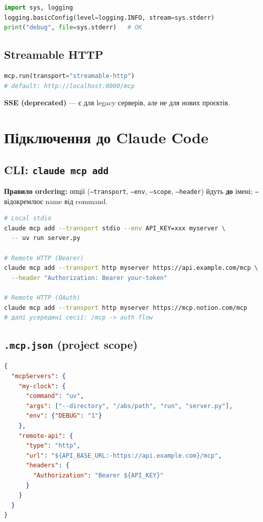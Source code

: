 \documentclass[11pt,a4paper]{article}
\begin{document}
\begin{lstlisting}[language=python]
import sys, logging
logging.basicConfig(level=logging.INFO, stream=sys.stderr)
print("debug", file=sys.stderr)   # OK
\end{lstlisting}

\subsection{Streamable HTTP}

\begin{lstlisting}[language=python]
mcp.run(transport="streamable-http")
# default: http://localhost:8000/mcp
\end{lstlisting}

\textbf{SSE (deprecated)} --- є для legacy серверів, але не для нових проєктів.

\section{Підключення до Claude Code}

\subsection{CLI: \texttt{claude mcp add}}

\textbf{Правило ordering:} опції (\texttt{--transport}, \texttt{--env}, \texttt{--scope}, \texttt{--header}) йдуть \textbf{до} імені; \texttt{--} відокремлює name від command.

\begin{lstlisting}[language=bash]
# Local stdio
claude mcp add --transport stdio --env API_KEY=xxx myserver \
  -- uv run server.py

# Remote HTTP (Bearer)
claude mcp add --transport http myserver https://api.example.com/mcp \
  --header "Authorization: Bearer your-token"

# Remote HTTP (OAuth)
claude mcp add --transport http myserver https://mcp.notion.com/mcp
# далі усередині сесії: /mcp -> auth flow
\end{lstlisting}

\subsection{\texttt{.mcp.json} (project scope)}

\begin{lstlisting}[language=json]
{
  "mcpServers": {
    "my-clock": {
      "command": "uv",
      "args": ["--directory", "/abs/path", "run", "server.py"],
      "env": {"DEBUG": "1"}
    },
    "remote-api": {
      "type": "http",
      "url": "${API_BASE_URL:-https://api.example.com}/mcp",
      "headers": {
        "Authorization": "Bearer ${API_KEY}"
      }
    }
  }
}
\end{lstlisting}
\end{document}

